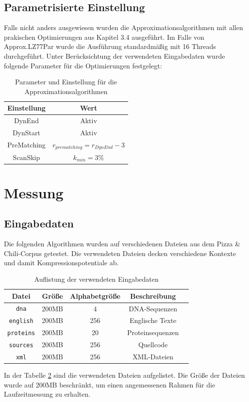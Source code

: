 \subsection{Parametrisierte Einstellung}
Falls nicht anders ausgewiesen wurden die Approximationsalgorithmen mit allen prakischen Optimierungen aus Kapitel 3.4 ausgeführt. Im Falle von Approx.LZ77Par
wurde die Ausführung standardmäßig mit 16 Threads durchgeführt. Unter Berücksichtung der verwendeten Eingabedaten wurde folgende Parameter für die 
Optimierungen festgelegt:
\begin{table} [ht]
    \centering
    \caption{Parameter und Einstellung für die Approximationsalgorithmen}
    \label{settings}
    \begin{tabular}{|c|c|}
        \hline
        \textbf{Einstellung} & \textbf{Wert} \\
        \hline
        DynEnd & Aktiv \\
        \hline
        DynStart & Aktiv \\
        \hline
        PreMatching & $r_{prematching}=r_{DynEnd}-3$ \\
        \hline
        ScanSkip & $k_{min}=3\%$ \\
        \hline
    \end{tabular}
\end{table}

\section{Messung}

\subsection{Eingabedaten}
Die folgenden Algorithmen wurden auf verschiedenen Dateien aus dem Pizza \& Chili-Corpus getestet. Die verwendeten Dateien decken verschiedene Kontexte und damit
Kompressionspotentiale ab.
\begin{table}[ht]
    \centering
    \caption{Auflistung der verwendeten Eingabedaten}
    \label{inputdata}
    \begin{tabular}{|c|c|c|c|c|}
        \hline
        \textbf{Datei} & \textbf{Größe} & \textbf{Alphabetgröße} & \textbf{Beschreibung} \\
        \hline
        \texttt{dna} & 200MB & 4 & DNA-Sequenzen \\
        \hline
        \texttt{english} & 200MB & 256 & Englische Texte \\
        \hline
        \texttt{proteins} & 200MB & 20 & Proteinsequenzen \\
        \hline
        \texttt{sources} & 200MB & 256 & Quellcode \\
        \hline
        \texttt{xml} & 200MB & 256 & XML-Dateien \\
        \hline
    \end{tabular}
\end{table}
In der Tabelle \ref{inputdata} sind die verwendeten Dateien aufgelistet. Die Größe der Dateien wurde auf 200MB beschränkt, um einen angemessenen Rahmen für die 
Laufzeitmessung zu erhalten.

